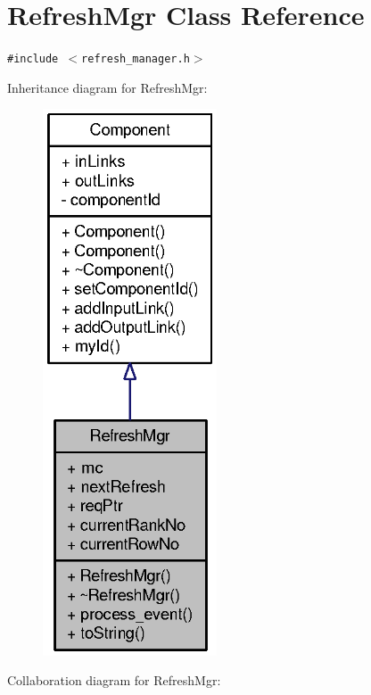 \section{RefreshMgr Class Reference}
\label{classRefreshMgr}
{\tt \#include $<$refresh\_\-manager.h$>$}

Inheritance diagram for RefreshMgr:\nopagebreak
\begin{figure}[H]
\begin{center}
\leavevmode
\includegraphics[width=146pt]{classRefreshMgr__inherit__graph}
\end{center}
\end{figure}
Collaboration diagram for RefreshMgr:\nopagebreak
